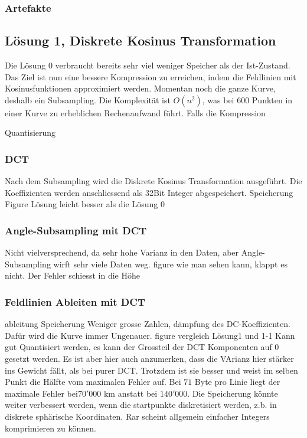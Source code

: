 \subsubsection{Artefakte}

\subsection{Lösung 1, Diskrete Kosinus Transformation}
Die Lösung 0 verbraucht bereits sehr viel weniger Speicher als der Ist-Zustand. Das Ziel ist nun eine bessere Kompression zu erreichen, indem die Feldlinien mit Kosinusfunktionen approximiert werden.
Momentan noch die ganze Kurve, deshalb ein Subsampling. Die Komplexität ist $O(n^2)$, was bei $600$ Punkten in einer Kurve zu erheblichen Rechenaufwand führt. Falls die Kompression 

Quantisierung

\subsubsection{DCT}
Nach dem Subsampling wird die Diskrete Kosinus Transformation ausgeführt. Die Koeffizienten werden anschliessend als 32Bit Integer abgespeichert.
Speicherung
Figure
Lösung leicht besser als die Lösung 0



\subsubsection{Angle-Subsampling mit DCT}
Nicht vielversprechend, da sehr hohe Varianz in den Daten, aber Angle-Subsampling wirft sehr viele Daten weg.
figure 
wie man sehen kann, klappt es nicht. Der Fehler schiesst in die Höhe

\subsubsection{Feldlinien Ableiten mit DCT}\label{resultate:dct:ableitung_dct}
ableitung
Speicherung
Weniger grosse Zahlen, dämpfung des DC-Koeffizienten. Dafür wird die Kurve immer Ungenauer.
figure vergleich Lösung1 und 1-1
Kann gut Quantisiert werden, es kann der Grossteil der DCT Komponenten auf 0 gesetzt werden. Es ist aber hier auch anzumerken, dass die VArianz hier stärker ins  Gewicht fällt, als bei purer DCT. Trotzdem ist sie besser und weist im selben Punkt die Hälfte vom maximalen Fehler auf. Bei $71$ Byte pro Linie liegt der maximale Fehler bei$70'000$ km anstatt bei $140'000$.
Die Speicherung könnte weiter verbessert werden, wenn die startpunkte diskretisiert werden, z.b. in diskrete sphärische Koordinaten. Rar scheint allgemein einfacher Integers komprimieren zu können.



